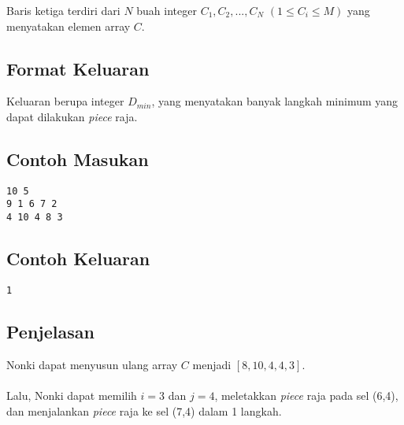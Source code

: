 \documentclass{article}
\begin{document}
Baris ketiga terdiri dari $N$ buah integer $C_1,C_2,...,C_N$ $(1 \leq C_i \leq M)$ yang menyatakan elemen array $C$.

\subsection*{Format Keluaran}
Keluaran berupa integer $D_{min}$, yang menyatakan banyak langkah minimum yang dapat dilakukan \textit{piece} raja.

\begin{multicols}{2}
\subsection*{Contoh Masukan}
\begin{lstlisting}
10 5
9 1 6 7 2
4 10 4 8 3

\end{lstlisting}
\columnbreak
\subsection*{Contoh Keluaran}
\begin{lstlisting}
1
\end{lstlisting}
\vfill
\null
\end{multicols}

\subsection*{Penjelasan}
Nonki dapat menyusun ulang array $C$ menjadi $[8, 10, 4, 4, 3]$.
\\\\
Lalu, Nonki dapat memilih $i=3$ dan $j=4$, meletakkan \textit{piece} raja pada sel (6,4), dan menjalankan \textit{piece} raja ke sel (7,4) dalam 1 langkah.
\end{document}
